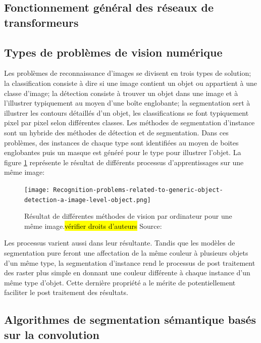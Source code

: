   \subsection{Fonctionnement général des réseaux de transformeurs}
  \subsection{Types de problèmes de vision numérique}
  Les problèmes de reconnaissance d'images se divisent en trois types de solution; la classification consiste à dire si une image contient un objet ou appartient à une classe d'image; la détection consiste à trouver un objet dans une image et à l'illustrer typiquement au moyen d'une boîte englobante; la segmentation sert à illustrer les contours détaillés d'un objet, les classifications se font typiquement pixel par pixel selon différentes classes. Les méthodes de segmentation d'instance sont un hybride des méthodes de détection et de segmentation. Dans ces problèmes, des instances de chaque type sont identifiées au moyen de boites englobantes puis un masque est généré pour le type pour illustrer l'objet. La figure \ref{fig:computer_vision_problems} représente le résultat de différents processus d'apprentissages sur une même image:
  \begin{figure}[!h]
    \centering
    \texttt{[image: Recognition-problems-related-to-generic-object-detection-a-image-level-object.png]}
    \caption{Résultat de différentes méthodes de vision par ordinateur pour une même image.\hl{vérifier droits d'auteurs} Source: \cite{Minaee:ImageSegmentation:2022}}
    \label{fig:computer_vision_problems}
  \end{figure}
  Les processus varient aussi dans leur résultante. Tandis que les modèles de segmentation pure feront une affectation de la même couleur à plusieurs objets d'un même type, la segmentation d'instance rend le processus de post traitement des raster plus simple en donnant une couleur différente à chaque instance d'un même type d'objet. Cette dernière propriété a le mérite de potentiellement faciliter le post traitement des résultats.
  \subsection{Algorithmes de segmentation sémantique basés sur la convolution}

